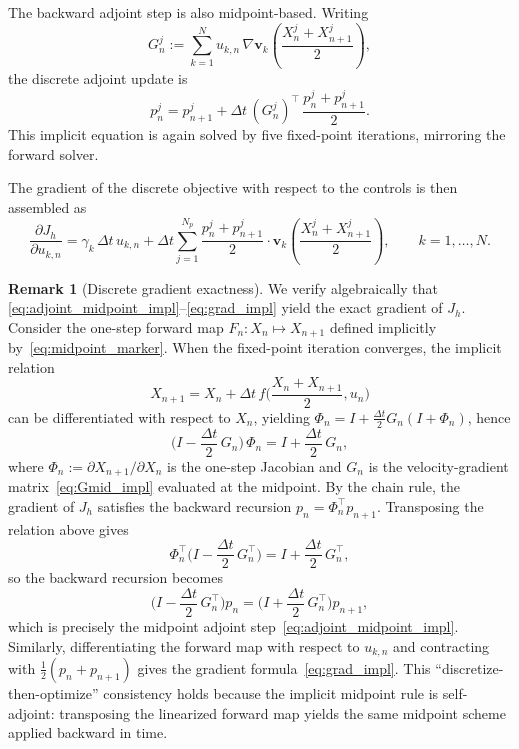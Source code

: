 \documentclass[12pt, reqno]{amsart}
\theoremstyle{plain}
\theoremstyle{definition}
\newtheorem{remark}[thm]{Remark}
\numberwithin{equation}{section}
\numberwithin{figure}{section}
\numberwithin{algorithm}{section}
\begin{document}
The backward adjoint step is also midpoint-based. Writing
\begin{equation}\label{eq:Gmid_impl}
G_n^j
:=
\sum_{k=1}^N u_{k,n}\,\nabla \mathbf v_k\!\left(\frac{X_n^j+X_{n+1}^j}{2}\right),
\end{equation}
the discrete adjoint update is
\begin{equation}\label{eq:adjoint_midpoint_impl}
p_n^j
=
p_{n+1}^j
+\Delta t\,(G_n^j)^\top\,\frac{p_n^j+p_{n+1}^j}{2}.
\end{equation}
This implicit equation is again solved by five fixed-point iterations, mirroring the forward solver.

The gradient of the discrete objective with respect to the controls is then assembled as
\begin{equation}\label{eq:grad_impl}
\frac{\partial J_h}{\partial u_{k,n}}
=
\gamma_k\,\Delta t\,u_{k,n}
+\Delta t\sum_{j=1}^{N_p}
\frac{p_n^j+p_{n+1}^j}{2}\cdot
\mathbf v_k\!\left(\frac{X_n^j+X_{n+1}^j}{2}\right),
\qquad k=1,\dots,N.
\end{equation}
\begin{remark}[Discrete gradient exactness]\label{rem:discrete_exact}
We verify algebraically that \eqref{eq:adjoint_midpoint_impl}--\eqref{eq:grad_impl} yield the exact gradient of $J_h$.
Consider the one-step forward map $F_n:X_n\mapsto X_{n+1}$ defined implicitly by~\eqref{eq:midpoint_marker}. When the fixed-point iteration converges, the implicit relation
\[
X_{n+1}=X_n+\Delta t\,f\!\Big(\frac{X_n+X_{n+1}}{2},u_n\Big)
\]
can be differentiated with respect to $X_n$, yielding $\Phi_n=I+\frac{\Delta t}{2}G_n(I+\Phi_n)$, hence
\[
\Big(I-\frac{\Delta t}{2}\,G_n\Big)\,\Phi_n
=I+\frac{\Delta t}{2}\,G_n,
\]
where $\Phi_n:=\partial X_{n+1}/\partial X_n$ is the one-step Jacobian and $G_n$ is the velocity-gradient matrix~\eqref{eq:Gmid_impl} evaluated at the midpoint. By the chain rule, the gradient of $J_h$ satisfies the backward recursion $p_n=\Phi_n^\top p_{n+1}$. Transposing the relation above gives
\[
\Phi_n^\top\Big(I-\frac{\Delta t}{2}\,G_n^\top\Big)
=I+\frac{\Delta t}{2}\,G_n^\top,
\]
so the backward recursion becomes
\[
\Big(I-\frac{\Delta t}{2}\,G_n^\top\Big)p_n
=\Big(I+\frac{\Delta t}{2}\,G_n^\top\Big)p_{n+1},
\]
which is precisely the midpoint adjoint step~\eqref{eq:adjoint_midpoint_impl}. Similarly, differentiating the forward map with respect to $u_{k,n}$ and contracting with $\frac{1}{2}(p_n+p_{n+1})$ gives the gradient formula~\eqref{eq:grad_impl}. This ``discretize-then-optimize'' consistency holds because the implicit midpoint rule is self-adjoint: transposing the linearized forward map yields the same midpoint scheme applied backward in time.
\end{remark}
\end{document}
